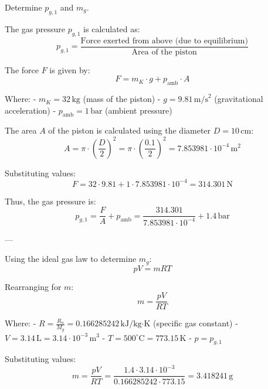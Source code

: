 Determine \( p_{g,1} \) and \( m_g \).  

The gas pressure \( p_{g,1} \) is calculated as:  
\[
p_{g,1} = \frac{\text{Force exerted from above (due to equilibrium)}}{\text{Area of the piston}}  
\]

The force \( F \) is given by:  
\[
F = m_K \cdot g + p_{\text{amb}} \cdot A  
\]

Where:  
- \( m_K = 32 \, \text{kg} \) (mass of the piston)  
- \( g = 9.81 \, \text{m/s}^2 \) (gravitational acceleration)  
- \( p_{\text{amb}} = 1 \, \text{bar} \) (ambient pressure)  

The area \( A \) of the piston is calculated using the diameter \( D = 10 \, \text{cm} \):  
\[
A = \pi \cdot \left(\frac{D}{2}\right)^2 = \pi \cdot \left(\frac{0.1}{2}\right)^2 = 7.853981 \cdot 10^{-4} \, \text{m}^2  
\]

Substituting values:  
\[
F = 32 \cdot 9.81 + 1 \cdot 7.853981 \cdot 10^{-4} = 314.301 \, \text{N}  
\]

Thus, the gas pressure is:  
\[
p_{g,1} = \frac{F}{A} + p_{\text{amb}} = \frac{314.301}{7.853981 \cdot 10^{-4}} + 1.4 \, \text{bar}  
\]

---

Using the ideal gas law to determine \( m_g \):  
\[
pV = mRT  
\]

Rearranging for \( m \):  
\[
m = \frac{pV}{RT}  
\]

Where:  
- \( R = \frac{R_u}{M_g} = 0.166285242 \, \text{kJ/kg·K} \) (specific gas constant)  
- \( V = 3.14 \, \text{L} = 3.14 \cdot 10^{-3} \, \text{m}^3 \)  
- \( T = 500^\circ\text{C} = 773.15 \, \text{K} \)  
- \( p = p_{g,1} \)  

Substituting values:  
\[
m = \frac{pV}{RT} = \frac{1.4 \cdot 3.14 \cdot 10^{-3}}{0.166285242 \cdot 773.15} = 3.418241 \, \text{g}  
\]